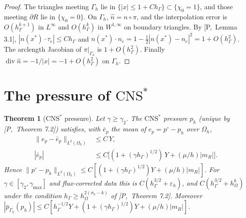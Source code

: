 \documentclass[11pt,reqno]{amsart}
\theoremstyle{plain}
\newtheorem{theorem}{Theorem}[section]
\theoremstyle{definition}
\newcommand{\hG}{h_\Gamma}
\newcommand{\hO}{h_\Omega}
\newcommand{\Gh}{\Gamma_h}
\newcommand{\Oh}{\Omega_h}
\newcommand{\pbar}{\bar p}
\newcommand{\norm}[1]{\lVert #1\rVert}
\newcommand{\CNS}{\mathrm{CNS}^\ast}
\newcommand{\eps}{\varepsilon_h}
\renewcommand{\div}{\operatorname{div}}
\newcommand{\Pref}[1]{\textup{[P,~#1]}}
\begin{document}
\begin{proof}
The triangles meeting $\Gh$ lie in $\{|x|\le1+C\hG\}\subset\{\chi_0=1\}$, and those meeting $\partial R$ lie in $\{\chi_0=0\}$. On $\Gh$, $\hat n=n\circ\pi$, and the interpolation error is $O(\hG^{k+1})$ in $L^\infty$ and $O(\hG^k)$ in $W^{1,\infty}$ on boundary triangles. By \Pref{Lemma 3.1}, $|n(x^\ast)\cdot\tau_e|\le C\hG$ and $n(x^\ast)\cdot n_e=1-\frac12|n(x^\ast)-n_e|^2=1+O(\hG^2)$. The arclength Jacobian of $\pi|_{\Gh}$ is $1+O(\hG^2)$. Finally $\div\hat n=-1/|x|=-1+O(\hG^2)$ on $\Gh$.
\end{proof}

\section{The pressure of \texorpdfstring{$\CNS$}{CNS*}}\label{pd:sec:cnsp}

\begin{theorem}[$\CNS$ pressure]\label{pd:thm:cnsp}
Let $\gamma\ge\gamma_2$. The $\CNS$ pressure $p_h$ (unique by \Pref{Theorem 7.2}) satisfies, with $\bar e_p$ the mean of $e_p=p^\circ-p_h$ over $\Oh$,
\begin{align*}
\norm{e_p-\bar e_p}_{L^2(\Oh)}&\le C\,Y,\\
|\bar e_p|&\le C\bigl[(1+(\gamma\hG)^{1/2})\,Y+(\mu/h)|m_R|\bigr].
\end{align*}
Hence $\norm{p^\circ-p_h}_{L^2(\Oh)}\le C[(1+(\gamma\hG)^{1/2})Y+(\mu/h)|m_R|]$. For $\gamma\in[\gamma_2,\gamma_{\max}]$ and flux-corrected data this is $C(\hG^{3/2}+\eps)$, and $C(\hG^{3/2}+\hO^k)$ under the condition $\hG\ge\hO^{2(\sigma_k-k)}$ of \Pref{Theorem 7.2}. Moreover $|\pbar_{\Gh}(p_h)|\le C[\hG^{-1/2}Y+(1+(\gamma\hG)^{1/2})Y+(\mu/h)|m_R|]$.
\end{theorem}
\end{document}

